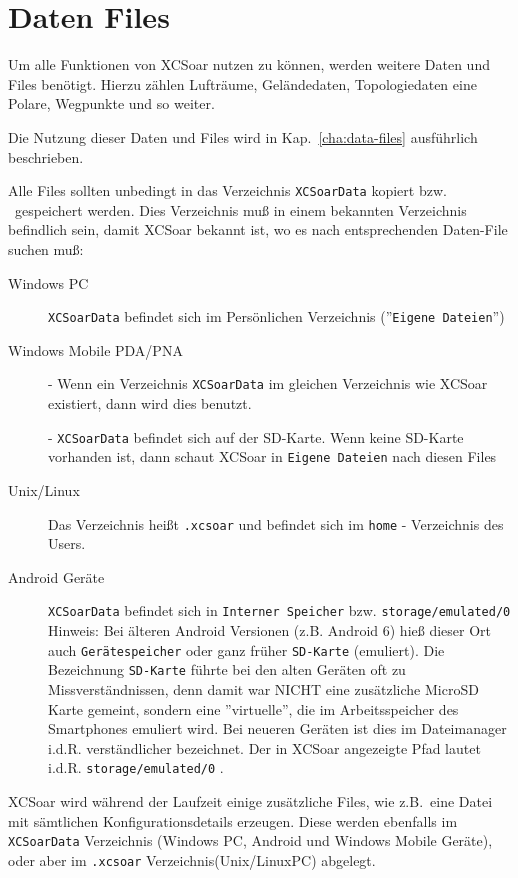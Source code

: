 \section{Daten Files}\label{InstallationDatenfiles}

Um alle Funktionen von {\textsf  XCSoar} nutzen zu können, werden weitere Daten und Files benötigt.
Hierzu zählen Lufträume, Geländedaten, Topologiedaten eine Polare, Wegpunkte und so weiter. 


Die Nutzung dieser Daten und Files wird in Kap.~\ref{cha:data-files} ausführlich beschrieben. 

Alle Files sollten unbedingt in das Verzeichnis \texttt{XCSoarData} kopiert bzw. \ gespeichert werden. 
Dies Verzeichnis muß  in einem bekannten Verzeichnis befindlich sein, damit {\textsf  XCSoar} bekannt ist, wo es nach entsprechenden 
Daten-File suchen muß: 

 
\begin{description}
\item[Windows PC]
\texttt{XCSoarData} befindet sich im Persönlichen Verzeichnis (''\texttt{Eigene Dateien}'')
\item[Windows Mobile PDA/PNA]
- Wenn ein Verzeichnis \texttt{XCSoarData} im gleichen Verzeichnis wie {\textsf  XCSoar} existiert, dann wird dies benutzt.  


- \texttt{XCSoarData} befindet sich auf der SD-Karte.  Wenn keine SD-Karte vorhanden ist, dann schaut {\textsf  XCSoar} in \texttt{Eigene Dateien} nach diesen Files

\item[Unix/Linux]
Das Verzeichnis heißt \verb|.xcsoar| und befindet sich im \verb|home| - Verzeichnis des Users. 
\item[Android Geräte]
\texttt{XCSoarData} befindet sich in \texttt{Interner Speicher} bzw. \texttt{storage/emulated/0}
Hinweis: Bei älteren Android Versionen (z.B. Android 6) hieß dieser Ort auch \texttt{Gerätespeicher} oder ganz früher \texttt{SD-Karte} (emuliert). Die Bezeichnung \texttt{SD-Karte} führte bei den alten Geräten oft zu Missverständnissen,  denn damit war NICHT eine zusätzliche MicroSD Karte gemeint, sondern eine ''virtuelle'', die im Arbeitsspeicher des Smartphones emuliert wird. Bei neueren Geräten ist dies im Dateimanager i.d.R. verständlicher bezeichnet. Der in {\textsf  XCSoar} angezeigte Pfad lautet i.d.R. \texttt{storage/emulated/0} .
\end{description}


{\textsf  XCSoar} wird während der Laufzeit einige zusätzliche Files, wie z.B.\ eine Datei mit sämtlichen Konfigurationsdetails erzeugen.
Diese werden ebenfalls im \texttt{XCSoarData} Verzeichnis (Windows PC, Android und Windows Mobile Geräte), oder aber im \texttt{.xcsoar} 
Verzeichnis(Unix/LinuxPC) abgelegt. 

